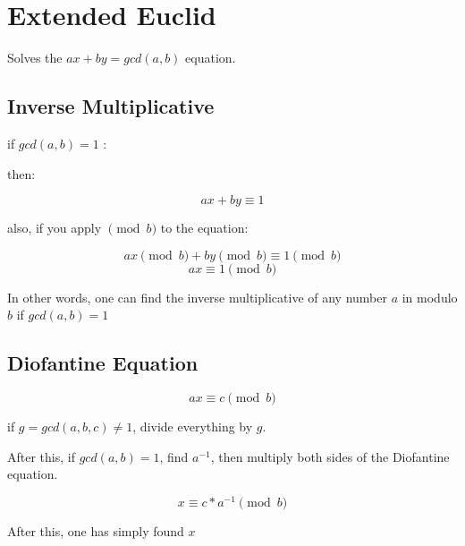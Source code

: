 
\section{Extended Euclid}

    Solves the $ ax + by = gcd(a, b)$ equation.

    \subsection{Inverse Multiplicative}

    if \textbf{ $gcd(a, b) = 1$ }:

    then:

    $$ax + by \equiv 1$$

    also, if you apply $\pmod{b}$ to the equation:

    $$ ax \pmod{b} + by \pmod{b} \equiv 1 \pmod{b} $$
    $$ ax \equiv 1 \pmod{b} $$

    In other words, one can find the inverse multiplicative of any number $a$ in modulo $b$ if $gcd(a, b) = 1$

    \subsection{Diofantine Equation}

    $$ ax \equiv c \pmod{b} $$

    if $g = gcd({a, b, c}) \neq 1$, divide everything by $g$.

    After this, if $gcd(a, b) = 1$, find $a^{-1}$, then multiply both sides of the Diofantine equation.

    $$ x \equiv c * a^{-1} \pmod{b} $$

    After this, one has simply found $x$

